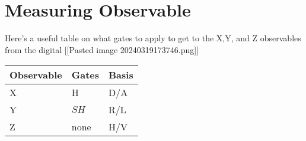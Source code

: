 \documentclass[
]{article}
\begin{document}
\hypertarget{measuring-observable}{%
\section{Measuring Observable}\label{measuring-observable}}

Here's a useful table on what gates to apply to get to the X,Y, and Z
observables from the digital {[}{[}Pasted image 20240319173746.png{]}{]}

\begin{longtable}[]{@{}lll@{}}
\toprule\noalign{}
Observable & Gates & Basis \\
\midrule\noalign{}
\endhead
\bottomrule\noalign{}
\endlastfoot
X & H & D/A \\
Y & \(S H\) & R/L \\
Z & none & H/V \\
\end{longtable}
\end{document}
